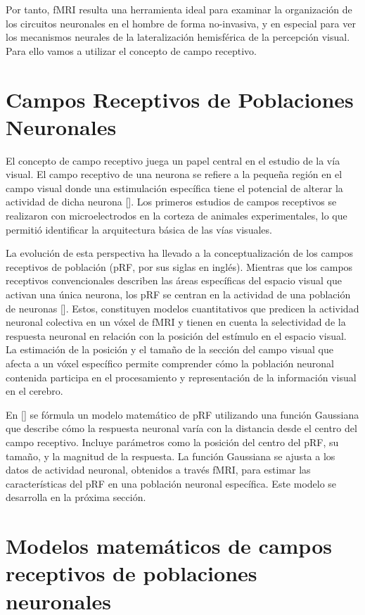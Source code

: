Por tanto, fMRI resulta una herramienta ideal para examinar la organización de los circuitos neuronales en el hombre de forma no-invasiva, y en especial para ver los mecanismos neurales de la lateralización hemisférica de la percepción visual. Para ello vamos a utilizar el concepto de campo receptivo.

\section{Campos Receptivos de Poblaciones Neuronales}

El concepto de campo receptivo juega un papel central en el estudio de la vía visual. El campo receptivo de una neurona se refiere a la pequeña región en el campo visual donde una estimulación específica tiene el potencial de alterar la actividad de dicha neurona [\cite{kandel_principles_2021}]. Los primeros estudios de campos receptivos se realizaron con microelectrodos en la corteza de animales experimentales, lo que permitió identificar la arquitectura básica de las vías visuales. 

La evolución de esta perspectiva ha llevado a la conceptualización de los campos receptivos de población (pRF, por sus siglas en ingl\'es). Mientras que los campos receptivos convencionales describen las áreas específicas del espacio visual que activan una única neurona, los pRF se centran en la actividad de una población de neuronas [\cite{dumoulin_population_2008}]. Estos, constituyen modelos cuantitativos que predicen la actividad neuronal colectiva en un vóxel de fMRI y tienen en cuenta la selectividad de la respuesta neuronal en relación con la posición del estímulo en el espacio visual. La estimación de la posición y el tamaño de la sección del campo visual que afecta a un vóxel específico permite comprender cómo la población neuronal contenida participa en el procesamiento y representación de la información visual en el cerebro.

En [\cite{dumoulin_population_2008}] se f\'ormula un modelo matemático de pRF utilizando una función Gaussiana que describe cómo la respuesta neuronal varía con la distancia desde el centro del campo receptivo. Incluye parámetros como la posición del centro del pRF, su tamaño, y la magnitud de la respuesta. La función Gaussiana se ajusta a los datos de actividad neuronal, obtenidos a través fMRI, para estimar las características del pRF en una población neuronal específica. Este modelo se desarrolla en la próxima sección.


\section{Modelos matemáticos de campos receptivos de poblaciones neuronales}

